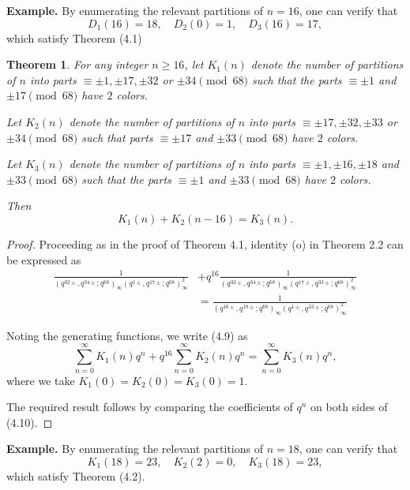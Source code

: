 \documentclass[11pt,a4paper]{article}
\numberwithin{equation}{section}
\theoremstyle{plain}
\newtheorem{theorem}{Theorem}[section]
\begin{document}
\medskip

\textbf{Example.}
By enumerating the relevant partitions of $n = 16$, one can verify that 
\[
D_1(16) = 18, \quad D_2(0) = 1, \quad D_3(16) = 17,
\]
which satisfy Theorem (4.1)

\begin{theorem}
For any integer $n \geq 16$, let $K_1(n)$ denote the number of partitions of $n$ into parts 
$\equiv \pm 1, \pm 17, \pm 32$ or $\pm 34 \pmod{68}$ such that the parts $\equiv \pm 1$ and $\pm 17 \pmod{68}$ have $2$ colors. 

Let $K_2(n)$ denote the number of partitions of $n$ into parts 
$\equiv \pm 17, \pm 32, \pm 33$ or $\pm 34 \pmod{68}$ such that parts $\equiv \pm 17$ and $\pm 33 \pmod{68}$ have $2$ colors. 

Let $K_3(n)$ denote the number of partitions of $n$ into parts 
$\equiv \pm 1, \pm 16, \pm 18$ and $\pm 33 \pmod{68}$ such that the parts $\equiv \pm 1$ and $\pm 33 \pmod{68}$ have $2$ colors. 

Then
\[
K_1(n) + K_2(n-16) = K_3(n).
\]
\end{theorem}

\begin{proof}
    Proceeding as in the proof of Theorem 4.1, identity (o) in Theorem 2.2 can be expressed as
\begin{align}
	\frac{1}{(q^{32\pm}, q^{34\pm}; q^{68})_{\infty}(q^{1\pm}, q^{17\pm}; q^{68})_{\infty}^2}
	&+ q^{16} \frac{1}{(q^{32\pm}, q^{34\pm}; q^{68})_{\infty}(q^{17\pm}, q^{33\pm}; q^{68})_{\infty}^2} \\
	&= \frac{1}{(q^{16\pm}, q^{18\pm}; q^{68})_{\infty}(q^{1\pm}, q^{33\pm}; q^{68})_{\infty}^2}
	\tag{4.9}
\end{align}

Noting the generating functions, we write (4.9) as
\begin{equation}
\sum_{n=0}^{\infty} K_1(n) q^n
+ q^{16} \sum_{n=0}^{\infty} K_2(n) q^n
= \sum_{n=0}^{\infty} K_3(n) q^n,
\tag{4.10}
\end{equation}
where we take $K_1(0) = K_2(0) = K_3(0) = 1$.

The required result follows by comparing the coefficients of $q^n$ on both sides of (4.10).
\end{proof}

\medskip

\textbf{Example.}
By enumerating the relevant partitions of $n = 18$, one can verify that
\[
K_1(18) = 23, \quad K_2(2) = 0, \quad K_3(18) = 23,
\]
which satisfy Theorem (4.2).
\end{document}
